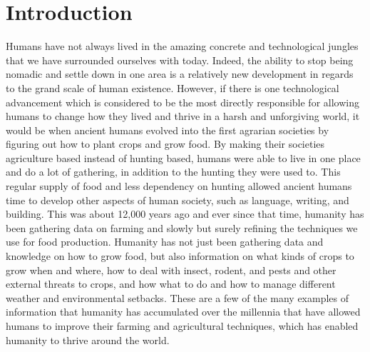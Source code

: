 \documentclass[sigconf]{acmart}
\begin{document}
\section{Introduction}

Humans have not always lived in the amazing concrete and technological jungles that we have surrounded ourselves with today. Indeed, the ability to stop being nomadic and settle down in one area is a relatively new development in regards to the grand scale of human existence. However, if there is one technological advancement which is considered to be the most directly responsible for allowing humans to change how they lived and thrive in a harsh and unforgiving world, it would be when ancient humans evolved into the first agrarian societies by figuring out how to plant crops and grow food. By making their societies agriculture based instead of hunting based, humans were able to live in one place and do a lot of gathering, in addition to the hunting they were used to. This regular supply of food and less dependency on hunting allowed ancient humans time to develop other aspects of human society, such as language, writing, and building.  This was about 12,000 years ago and ever since that time, humanity has been gathering data on farming and slowly but surely refining the techniques we use for food production. Humanity has not just been gathering data and knowledge on how to grow food, but also information on what kinds of crops to grow when and where, how to deal with insect, rodent, and pests and other external threats to crops, and how what to do and how to manage different weather and environmental setbacks. These are a few of the many examples of information that humanity has accumulated over the millennia that have allowed humans to improve their farming and agricultural techniques, which has enabled humanity to thrive around the world.
\end{document}
